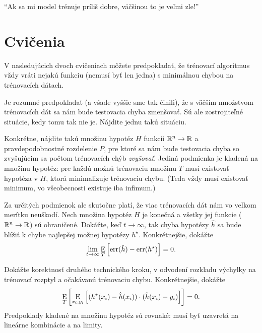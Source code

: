 \begin{remark}
  ``Ak sa mi model trénuje príliš dobre, väčšinou to je veľmi zle!''
\end{remark}



\section{Cvičenia}

V nasledujúcich dvoch cvičeniach môžete predpokladať, že trénovací
algoritmus vždy vráti nejakú funkciu (nemusí byť len jedna)
s minimálnou chybou na trénovacích dátach.

\begin{exercise}
  Je rozumné predpokladať (a všade vyššie sme tak činili), že s väčším
  množstvom trénovacích dát sa nám bude testovacia chyba zmenšovať. Sú
  ale zostrojiteľné situácie, kedy tomu tak nie je. Nájdite jednu takú
  situáciu.
  
  Konkrétne, nájdite takú množinu hypotéz $H$ funkcii $\mathbb{R}^n \to \mathbb{R}$
  a pravdepodobnostné rozdelenie $P$, pre ktoré sa nám bude testovacia
  chyba so zvyšujúcim sa počtom trénovacích chýb \emph{zvyšovať}. Jediná
  podmienka je kladená na množinu hypotéz: pre každú možnú trénovaciu
  množinu $T$ musí existovať hypotéza v $H$, ktorá minimalizuje
  trénovaciu chybu. (Teda vždy musí existovať minimum, vo všeobecnosti
  existuje iba infimum.)
\end{exercise}

\begin{exercise}
  Za určitých podmienok ale skutočne platí, že viac trénovacích dát
  nám vo veľkom merítku neuškodí. Nech množina hypotéz $H$ je konečná
  a všetky jej funkcie ($\mathbb{R}^n \to \mathbb{R}$) sú ohraničené. Dokážte,
  keď $t \to \infty$, tak chyba hypotézy $\hat{h}$ sa bude blížiť k
  chybe najlepšej možnej hypotézy $h^\star$. Konkrétnejšie, dokážte
  $$\lim_{t \to \infty} \operatorname*{\mathrm{E}}_T \left[ \mathrm{err}(\hat{h}) - \mathrm{err}(h^\star) \right] = 0.$$
\end{exercise}

\begin{exercise}
  Dokážte korektnosť druhého technického kroku, v odvodení rozkladu
  výchylky na trénovací rozptyl a očakávanú trénovaciu chybu. Konkrétnejšie,
  dokážte
  $$ \operatorname*{\mathrm{E}}_T \left[ \operatorname*{\mathrm{E}}_{x_i, y_i} \left[ (h^\star(x_i) - \hat{h}(x_i)) \cdot (\hat{h}(x_i) - y_i) \right] \right] = 0. $$
  Predpoklady kladené na množinu hypotéz sú rovnaké: musí byť uzavretá
  na lineárne kombinácie a na limity.
\end{exercise}

